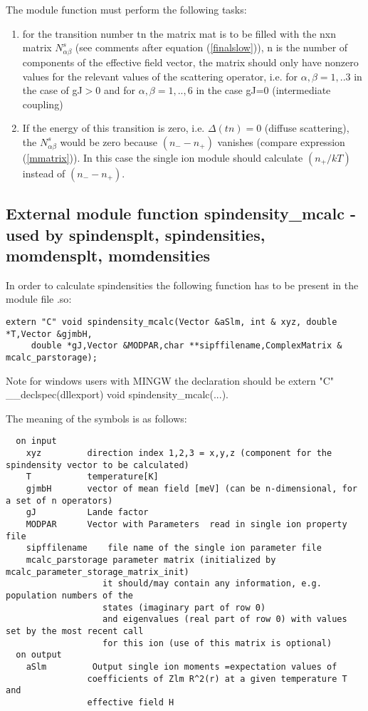 The module function must perform the following tasks:
\begin{enumerate}
\item for the transition number tn the matrix mat is to be filled with the nxn 
matrix $N^s_{\alpha\beta}$ (see comments after equation (\ref{finalslow})),
n is the number of components of the effective field vector, the 
matrix should only have nonzero values for the relevant values of
the scattering operator, i.e. for $\alpha,\beta=1,..3$ in the case of
gJ$>$0 and for $\alpha,\beta=1,..,6$ in the case gJ=0 (intermediate coupling)
\item
If the energy of this transition
is zero, i.e. $\Delta(tn)=0$ (diffuse scattering), 
the $N^s_{\alpha\beta}$ 
 would be zero because $(n_--n_+)$ vanishes (compare expression (\ref{mmatrix})).
In this case the single ion module should calculate $(n_+/kT)$ instead of $(n_--n_+)$.
\end{enumerate}

\subsection{External module function {\prg spindensity\_mcalc} -
used by {\prg spindensplt},
{\prg spindensities},
{\prg momdensplt},
{\prg momdensities}}

In order to calculate spindensities
the following function has to be
present in the module file {\prg *.so}:

\begin{verbatim}
extern "C" void spindensity_mcalc(Vector &aSlm, int & xyz, double *T,Vector &gjmbH,
     double *gJ,Vector &MODPAR,char **sipffilename,ComplexMatrix & mcalc_parstorage);
\end{verbatim}

Note for windows users with MINGW the declaration should be {\prg extern "C" \_\_declspec(dllexport) void %
spindensity\_mcalc(...)}.

The meaning of the symbols is as follows:
{\footnotesize
\begin{verbatim}
  on input
    xyz         direction index 1,2,3 = x,y,z (component for the spindensity vector to be calculated)
    T           temperature[K]
    gjmbH       vector of mean field [meV] (can be n-dimensional, for a set of n operators)
    gJ          Lande factor
    MODPAR      Vector with Parameters  read in single ion property file
    sipffilename    file name of the single ion parameter file
    mcalc_parstorage parameter matrix (initialized by mcalc_parameter_storage_matrix_init)
                   it should/may contain any information, e.g. population numbers of the
				   states (imaginary part of row 0)
                   and eigenvalues (real part of row 0) with values set by the most recent call
                   for this ion (use of this matrix is optional)
  on output
    aSlm         Output single ion moments =expectation values of
                coefficients of Zlm R^2(r) at a given temperature T and
                effective field H
\end{verbatim}
}

